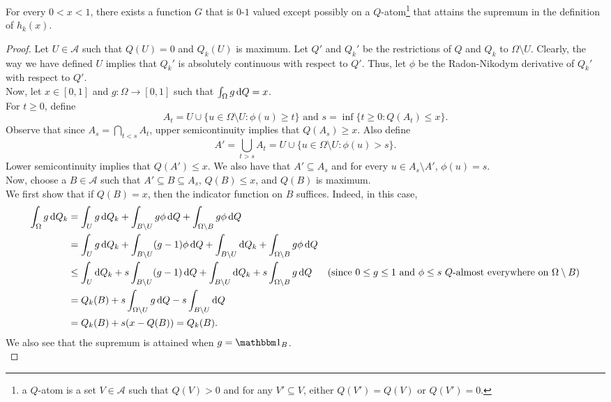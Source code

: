 \begin{lemma}
\label{hk distance supremum attained}
For every $0<x<1$, there exists a function $G$ that is $0$-$1$ valued except possibly on a $Q$-atom\footnote{a $Q$-atom is a set $V\in\mathcal{A}$ such that $Q(V)>0$ and for any $V'\subseteq V$, either $Q(V')=Q(V)$ or $Q(V')=0$.} that attains the supremum in the definition of $h_k(x)$.
\end{lemma}
\begin{proof}
Let $U\in\mathcal{A}$ such that $Q(U)=0$ and $Q_k(U)$ is maximum. Let $Q'$ and $Q_k'$ be the restrictions of $Q$ and $Q_k$ to $\Omega\setminus U$. Clearly, the way we have defined $U$ implies that $Q_k'$ is absolutely continuous with respect to $Q'$. Thus, let $\phi$ be the Radon-Nikodym derivative of $Q_k'$ with respect to $Q'$.\\
Now, let $x\in[0,1]$ and $g:\Omega\to[0,1]$ such that $\int_\Omega g\operatorname{d}\!{Q} = x$.\\
For $t\geq 0$, define
\[ A_t = U \cup \{u \in \Omega\setminus U : \phi(u) \geq t\}\text{ and }s=\inf\{t\geq 0 : Q(A_t) \leq x\}. \]
Observe that since $A_s = \bigcap_{t<s}A_t$, upper semicontinuity implies that $Q(A_s)\geq x$. Also define
\[ A' = \bigcup_{t>s} A_t = U \cup \{u \in \Omega\setminus U : \phi(u) > s\}. \]
Lower semicontinuity implies that $Q(A')\leq x$. We also have that $A'\subseteq A_s$ and for every $u\in A_s\setminus A'$, $\phi(u)=s$.\\
Now, choose a $B\in\mathcal{A}$ such that $A'\subseteq B\subseteq A_s$, $Q(B)\leq x$, and $Q(B)$ is maximum.\\
We first show that if $Q(B)=x$, then the indicator function on $B$ suffices. Indeed, in this case,
\begin{align*}
    \int_\Omega g\d{Q}_k &= \int_U g\d{Q}_k + \int_{B\setminus U} g\phi\d{Q} + \int_{\Omega\setminus B} g\phi\d{Q} \\
    &= \int_U g\d{Q}_k + \int_{B\setminus U} (g-1)\phi\d{Q} + \int_{B\setminus U} \d{Q}_k + \int_{\Omega\setminus B} g\phi\d{Q} \\
    &\leq \int_U \d{Q}_k + s\int_{B\setminus U} (g-1)\d{Q} + \int_{B\setminus U} \d{Q}_k + s\int_{\Omega\setminus B} g \d{Q} & \text{(since $0\leq g\leq 1$ and $\phi\leq s$ $Q$-almost everywhere on $\Omega\setminus B$)} \\
    &= Q_k(B) + s\int_{\Omega\setminus U} g\d{Q} - s\int_{B\setminus U}\d{Q} \\
    &= Q_k(B) + s(x - Q(B)) = Q_k(B).
\end{align*}
We also see that the supremum is attained when $g=\indic_B$.\\

\end{proof}
